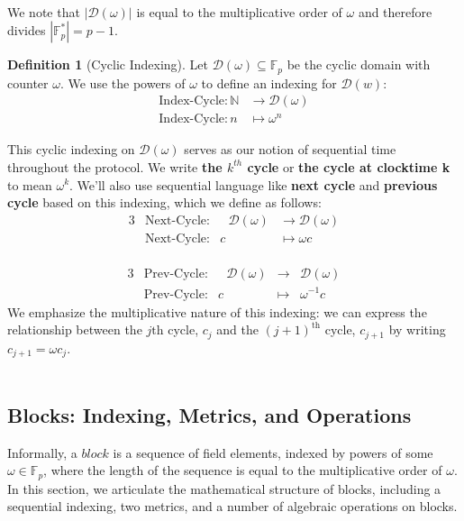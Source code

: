 \documentclass[10pt,letterpaper,titlepage]{article}
\newcommand{\GF}[1]{\mathbb{F}_{#1}}
\newcommand{\w}[0]{\omega}
\newcommand{\D}[0]{\mathcal{D}}
\theoremstyle{definition}
\newtheorem{definition}{Definition}
\begin{document}
\begin{appendices}
\\
We note that $|\D(\w)|$ is equal to the multiplicative order of $\w$ and therefore divides
$|\GF{p}^*|=p-1$. 
\\
\begin{definition}[Cyclic Indexing]
Let $\D(\w)\subseteq\mathbb{F}_p$ be the cyclic domain with counter $\omega$. 
We use the powers of $\omega$ to define an indexing for $\D(w)$:
\begin{align*}
  \text{Index-Cycle}:\mathbb{N}&\longrightarrow\D(\w)\\
  \text{Index-Cycle}:n&\longmapsto\w^n
\end{align*}
\end{definition}
\noindent
This cyclic indexing on $\D(\w)$ serves as our notion of sequential time throughout the protocol. 
We write \textbf{the $k^{th}$ cycle} or \textbf{the cycle at clocktime k} to mean $\omega^k$. 
We'll also use sequential language like \textbf{next cycle} and \textbf{previous cycle} based on this indexing, which we define as follows:
\begin{alignat*}{3}
 &\text{Next-Cycle}:&\text{ }\D(\w)&\longrightarrow\D(\w)\\
 &\text{Next-Cycle}:&c&\longmapsto\w c
\end{alignat*}
\\
\begin{alignat*}{3}
&\text{Prev-Cycle}:&\text{ }\D(\w)&\longrightarrow&\D(\w)\\
&\text{Prev-Cycle}:&c&\longmapsto&\w^{-1}c
\end{alignat*}
We emphasize the multiplicative nature of this indexing: we can express the relationship between the $j\text{th}$ cycle, $c_j$ and the $(j+1)^\text{th}$ cycle, $c_{j+1}$ by writing $c_{j+1}=\omega c_j$. \\
\\
\subsection{Blocks: Indexing, Metrics, and Operations}
\label{blocks}
Informally, a $\mathit{block}$ is a sequence of field elements, indexed by powers of some $\w\in\GF{p}$, where the length of the sequence is equal to the multiplicative order of $\w$.
In this section, we articulate the mathematical structure of blocks, including a sequential indexing, two metrics, and a number of algebraic operations on blocks.

\end{appendices}
\end{document}
